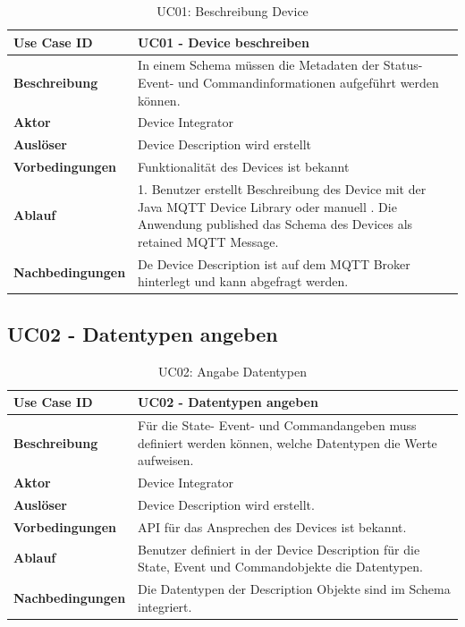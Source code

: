 \begin{table}[H]
\begin{tabularx}{\textwidth}{|l|X|}

 \hline
 {\bf Use Case ID }    & UC01 - Device beschreiben \\  \hline
 {\bf Beschreibung }   & In einem Schema müssen die Metadaten der Status- Event- und Commandinformationen aufgeführt werden können.
 \\ \hline
 {\bf Aktor }          & Device Integrator \\ \hline
 {\bf Auslöser }       & Device Description wird erstellt \\ \hline
 {\bf Vorbedingungen } & Funktionalität des Devices ist bekannt \\ \hline
 {\bf Ablauf }         & 
     1. Benutzer erstellt Beschreibung des Device mit der Java MQTT Device Library oder manuell \newline                                             
     2. Die Anwendung published das Schema des Devices als retained MQTT Message.  \\ \hline
 {\bf Nachbedingungen} & De Device Description ist auf dem MQTT Broker hinterlegt und kann abgefragt werden. \\ \hline
  
\end{tabularx}
\caption{UC01: Beschreibung Device}
\end{table}

\subsection{UC02 - Datentypen angeben}

\begin{table}[H]
\begin{tabularx}{\textwidth}{|l|X|}

 \hline
 {\bf Use Case ID }    & UC02 - Datentypen angeben \\  \hline
 {\bf Beschreibung }   & Für die State- Event- und Commandangeben muss definiert werden können, welche Datentypen die Werte aufweisen. \\ \hline
 {\bf Aktor }          & Device Integrator \\ \hline
 {\bf Auslöser }       & Device Description wird erstellt. \\ \hline
 {\bf Vorbedingungen } & API für das Ansprechen des Devices ist bekannt. \\ \hline
 {\bf Ablauf }         & Benutzer definiert in der Device Description für die State, Event und Commandobjekte die Datentypen. \\ \hline
 {\bf Nachbedingungen} &  Die Datentypen der Description Objekte sind im Schema integriert. \\ \hline
  
\end{tabularx}
\caption{UC02: Angabe Datentypen}
\end{table}

